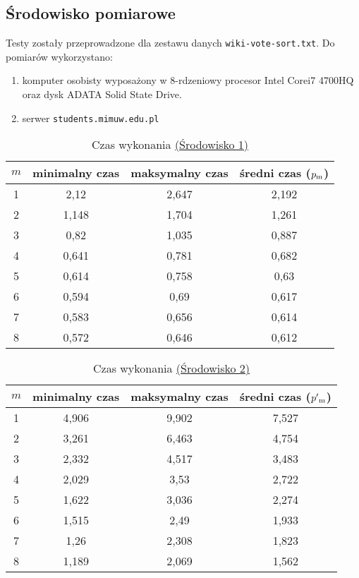 \documentclass{article}
\begin{document}
    \subsection{Środowisko pomiarowe}
    Testy zostały przeprowadzone dla zestawu danych \texttt{wiki-vote-sort.txt}.
    Do pomiarów wykorzystano:
    \begin{enumerate}[label={(\arabic*)}]
      \item
        \label{test:first}
        komputer osobisty wyposażony w 8-rdzeniowy procesor Intel\textsuperscript{
        \textregistered} Core\texttrademark i7 4700HQ oraz dysk ADATA\textsuperscript{
        \textregistered} Solid State Drive.
      \item
        \label{test:second}
        serwer \texttt{students.mimuw.edu.pl}
    \end{enumerate}

    \begin{table}[h]
      \centering
      \label{tab:times:first}
      \begin{tabular}{|c|c|c|c|}
        \hline
        \bfseries $m$ & \bfseries minimalny czas & \bfseries maksymalny czas &
        \bfseries średni czas ($p\textsubscript{m}$)\\
        \hline
        1 & 2,12  & 2,647 & 2,192 \\
        2 & 1,148 & 1,704 & 1,261 \\
        3 & 0,82  & 1,035 & 0,887 \\
        4 & 0,641 & 0,781 & 0,682 \\
        5 & 0,614 & 0,758 & 0,63  \\
        6 & 0,594 & 0,69  & 0,617 \\
        7 & 0,583 & 0,656 & 0,614 \\
        8 & 0,572 & 0,646 & 0,612 \\
        \hline
      \end{tabular}
      \caption{Czas wykonania \hyperref[test:first]{(Środowisko 1)}}
    \end{table}

    \begin{table}[h]
      \centering
      \label{tab:times:second}
      \begin{tabular}{|c|c|c|c|}
        \hline
        \bfseries $m$ & \bfseries minimalny czas & \bfseries maksymalny czas &
        \bfseries średni czas ($p'\textsubscript{m}$)\\
        \hline
        1 & 4,906 & 9,902 & 7,527 \\
        2 & 3,261 & 6,463 & 4,754 \\
        3 & 2,332 & 4,517 & 3,483 \\
        4 & 2,029 & 3,53  & 2,722 \\
        5 & 1,622 & 3,036 & 2,274 \\
        6 & 1,515 & 2,49  & 1,933 \\
        7 & 1,26  & 2,308 & 1,823 \\
        8 & 1,189 & 2,069 & 1,562 \\
        \hline
      \end{tabular}
      \caption{Czas wykonania \hyperref[test:second]{(Środowisko 2)}}
    \end{table}
\end{document}
